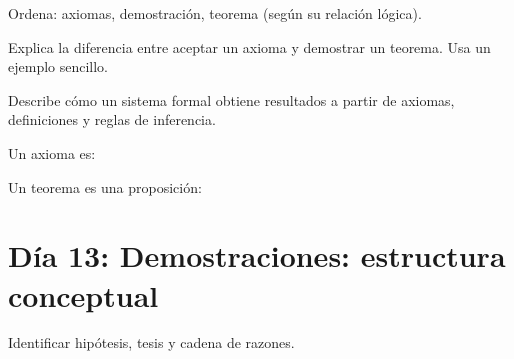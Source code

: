 \begin{activity}[id=dia-12-corta-06,type=short,weight=1]

Ordena: axiomas, demostración, teorema (según su relación lógica).

\end{activity}

\begin{activity}[id=dia-12-desarrollo-01,type=long,weight=2]

Explica la diferencia entre aceptar un axioma y demostrar un teorema. Usa un ejemplo sencillo.

\end{activity}

\begin{activity}[id=dia-12-desarrollo-02,type=long,weight=2]

Describe cómo un sistema formal obtiene resultados a partir de axiomas, definiciones y reglas de inferencia.

\end{activity}

\begin{activity}[id=dia-12-opcion-01,type=choice,weight=1]

Un axioma es:





\end{activity}

\begin{activity}[id=dia-12-opcion-02,type=choice,weight=1]

Un teorema es una proposición:





\end{activity}

\section{Día 13: Demostraciones: estructura conceptual}

\begin{lesson}[id=dia-13-lectura,weight=0]

Identificar hipótesis, tesis y cadena de razones.

\end{lesson}

